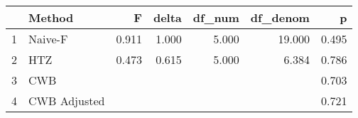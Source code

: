 \begin{table}[ht]
\centering
\begin{tabular}{rlrrrrr}
  \hline
 & Method & F & delta & df\_num & df\_denom & p \\ 
  \hline
1 & Naive-F & 0.911 & 1.000 & 5.000 & 19.000 & 0.495 \\ 
  2 & HTZ & 0.473 & 0.615 & 5.000 & 6.384 & 0.786 \\ 
  3 & CWB &  &  &  &  & 0.703 \\ 
  4 & CWB Adjusted &  &  &  &  & 0.721 \\ 
   \hline
\end{tabular}
\end{table}
